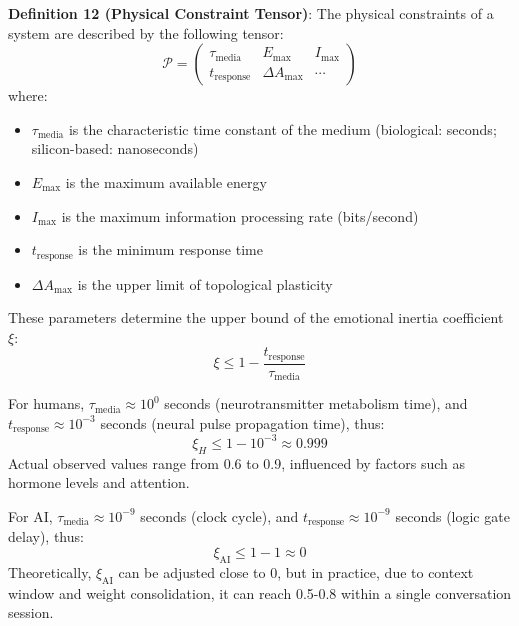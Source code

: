 \documentclass[12pt,a4paper]{article}
\theoremstyle{plain}
\begin{document}
\textbf{Definition 12 (Physical Constraint Tensor)}: The physical constraints of a system are described by the following tensor:
\begin{equation}
\mathcal{P} = \begin{pmatrix}
\tau_{\text{media}} & E_{\text{max}} & I_{\text{max}} \\
t_{\text{response}} & \Delta A_{\text{max}} & \cdots
\end{pmatrix}
\label{eq:physics_tensor}
\end{equation}
where:
\begin{itemize}
    \item $\tau_{\text{media}}$ is the characteristic time constant of the medium (biological: seconds; silicon-based: nanoseconds)
    \item $E_{\text{max}}$ is the maximum available energy
    \item $I_{\text{max}}$ is the maximum information processing rate (bits/second)
    \item $t_{\text{response}}$ is the minimum response time
    \item $\Delta A_{\text{max}}$ is the upper limit of topological plasticity
\end{itemize}

These parameters determine the upper bound of the emotional inertia coefficient $\xi$:
\begin{equation}
\xi \leq 1 - \frac{t_{\text{response}}}{\tau_{\text{media}}}
\label{eq:inertia_bound}
\end{equation}

For humans, $\tau_{\text{media}} \approx 10^0$ seconds (neurotransmitter metabolism time), and $t_{\text{response}} \approx 10^{-3}$ seconds (neural pulse propagation time), thus:
\begin{equation}
\xi_H \leq 1 - 10^{-3} \approx 0.999
\end{equation}
Actual observed values range from 0.6 to 0.9, influenced by factors such as hormone levels and attention.

For AI, $\tau_{\text{media}} \approx 10^{-9}$ seconds (clock cycle), and $t_{\text{response}} \approx 10^{-9}$ seconds (logic gate delay), thus:
\begin{equation}
\xi_{\text{AI}} \leq 1 - 1 \approx 0
\end{equation}
Theoretically, $\xi_{\text{AI}}$ can be adjusted close to 0, but in practice, due to context window and weight consolidation, it can reach 0.5-0.8 within a single conversation session.
\end{document}
